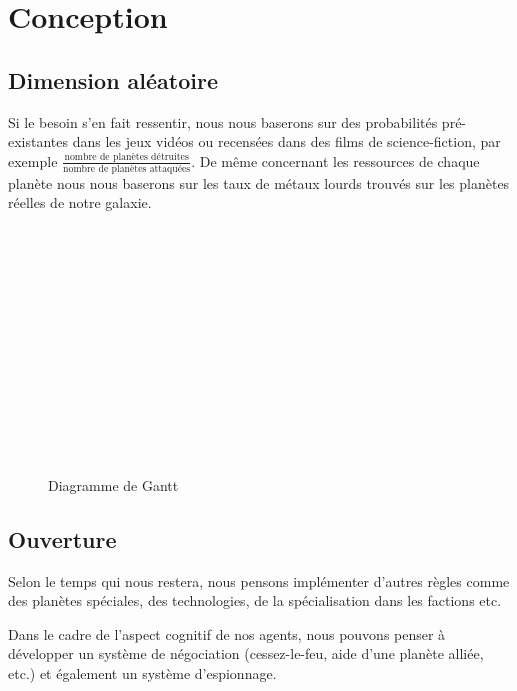 \documentclass{article}
\begin{document}
  \section{Conception}
    \subsection{Dimension aléatoire}
      Si le besoin s'en fait ressentir, nous nous baserons sur des probabilités pré-existantes dans les jeux vidéos ou recensées dans des films de science-fiction, par exemple $\displaystyle \frac{\text{nombre de planètes détruites}}{\text{nombre de planètes attaquées}} $. De même concernant les ressources de chaque planète nous nous baserons sur les taux de métaux lourds trouvés sur les planètes réelles de notre galaxie.
    
      \begin{figure}[H]
        \begin{ganttchart}{1}{12}
           \\
           \\
           \\
           \\
           \\
           \\
           \\
           \ganttnewline
           \\
           \\
           \\
           \\
		   \\
        \end{ganttchart}
        \caption{Diagramme de Gantt}
      \end{figure}
 
 \subsection{Ouverture}
    Selon le temps qui nous restera, nous pensons implémenter d'autres règles comme des planètes spéciales, des technologies, de la spécialisation dans les factions etc.

    Dans le cadre de l'aspect cognitif de nos agents, nous pouvons penser à développer un système de négociation (cessez-le-feu, aide d'une planète alliée, etc.) et également un système d'espionnage.
\end{document}
